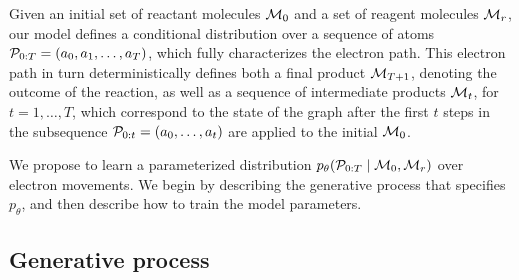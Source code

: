 Given an initial set of reactant molecules ${\mathcal{M}}_0$ and a set of reagent molecules ${\mathcal{M}}_r$, 
our model defines a conditional distribution over a sequence of atoms ${\mathcal{P}}_{0:T} = (a_0, a_1, \ldots, a_T)$,
which fully characterizes the electron path.
This electron path in turn deterministically defines both a final product ${\mathcal{M}}_{T+1}$, 
denoting the outcome of the reaction,
as well as a sequence of intermediate products ${\mathcal{M}}_t$, for $t = 1,\dots,T$,
which correspond to the state of the graph after the first $t$ steps in the subsequence ${\mathcal{P}}_{0:t} = (a_0, \dots, a_t)$ are applied to the initial ${\mathcal{M}}_0$.


We propose to learn a parameterized distribution $p_\theta( {\mathcal{P}}_{0:T} \mid {\mathcal{M}}_0, {\mathcal{M}}_r)$ over electron movements. 
We begin by describing the generative process %
that specifies $p_\theta$, and then describe how to train the model parameters.


\subsection{Generative process}

%




